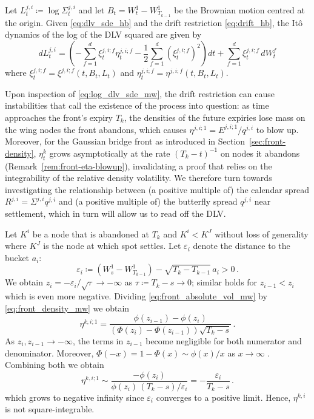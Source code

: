 \documentclass[smallextended,envcountsame,envcountsect]{svjour3}
\begin{document}
Let $L_t^{j,i}\coloneqq\log\Sigma_t^{j,i}$ and let $B_t = W_t^1 - W_{T_{k-1}}^1$ be the Brownian motion centred at the origin. Given \eqref{eq:dlv_sde_hb} and the drift restriction \eqref{eq:drift_hb}, the It\^o dynamics of the log of the DLV squared are given by 
\begin{equation}
  \label{eq:log_dlv_sde_mw}
  dL_t^{j,i}=\left(-\sum_{f=1}^d\xi_t^{j,i;f}\eta_t^{j,i;f}
    -\frac12\sum_{f=1}^d(\xi_t^{j,i;f})^2\right)dt+\sum_{f=1}^d\xi_t^{j,i;f}\,dW_t^f 
\end{equation}
where $\xi_t^{j,i;f} = \xi^{j,i;f}(t, B_t, L_t)$ and $\eta_t^{j,i;f} = \eta^{j,i;f}(t, B_t, L_t)$.

Upon inspection of \eqref{eq:log_dlv_sde_mw}, the drift restriction can cause instabilities that call the existence of the process into question: as time approaches the front's expiry $T_k$, the densities of the future expiries lose mass on the wing nodes the front abandons, which causes $\eta^{j, i; 1} = E^{j, i; 1} / q^{j, i}$ to blow up. 
Moreover, for the Gaussian bridge front as introduced in Section~\ref{sec:front-density}, $\eta_t^{k}$ grows asymptotically at the rate $(T_k - t)^{-1}$ on nodes it abandons (Remark~\ref{rem:front-eta-blowup}), invalidating a proof that relies on the integrability of the relative density volatility. We therefore turn towards investigating the relationship between (a positive multiple of) the calendar spread $R^{j, i} = \Sigma^{j, i} q^{j, i}$ and (a positive multiple of) the butterfly spread $q^{j, i}$ near settlement, which in turn will allow us to read off the DLV. 

\begin{remark}\label{rem:front-eta-blowup}
Let $K^i$ be a node that is abandoned at $T_k$ and $K^i < K^J$ without loss of generality where $K^J$ is the node at which spot settles. Let $\varepsilon_i$ denote the distance to the bucket $a_i$: 
$$ \varepsilon_i \coloneqq (W^1_s - W^1_{T_{k-1}}) - \sqrt{T_k - T_{k-1}} \, a_i > 0 \, . $$ 
We obtain $z_i = -\varepsilon_i / \sqrt{\tau}\to -\infty$ as $\tau \coloneqq T_k - s \to 0$; similar holds for $z_{i-1} < z_i$ which is even more negative. 
Dividing \eqref{eq:front_absolute_vol_mw} by \eqref{eq:front_density_mw} we obtain 
\begin{equation*}
  \eta^{k, i; 1} = \dfrac{\phi(z_{i-1}) - \phi(z_i)}{(\Phi(z_i) - \Phi(z_{i-1}))  \sqrt{T_k - s}} \, . 
\end{equation*}
As $z_i, z_{i-1} \to - \infty$, the terms in $z_{i-1}$ become negligible for both numerator and denominator. Moreover, $\Phi(-x) = 1-\Phi(x) \sim \phi(x)/x$ as $x \to \infty$ 
\citep[Ch.~VII, Lemma~2, p.~175]{feller-vol-1}. Combining both we obtain 
\begin{equation*}
  \eta^{k, i; 1} \sim \frac{-\phi(z_i)}{\phi(z_i)\,(T_k-s)/\varepsilon_i} = -\frac{\varepsilon_i}{T_k - s} \, . 
\end{equation*}
which grows to negative infinity since $\varepsilon_i$ converges to a positive limit. Hence, $\eta^{k,i}$ is not square-integrable. 
\end{remark}
\end{document}
